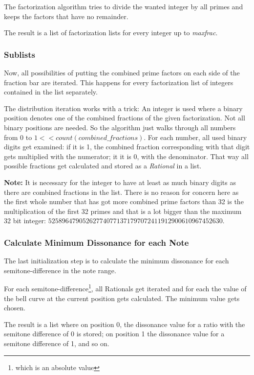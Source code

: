 \documentclass[12pt,a4paper,titlepage,oneside]{report}
\begin{document}
The factorization algorithm tries to divide the wanted integer by all primes and keeps the factors that have no remainder.

The result is a list of factorization lists for every integer up to \textit{maxfrac}.


\subsubsection{Sublists}

Now, all possibilities of putting the combined prime factors on each side of the fraction bar are iterated. This happens for every factorization list of integers contained in the list separately.

The distribution iteration works with a trick: An integer is used where a binary position denotes one of the combined fractions of the given factorization. Not all binary positions are needed. So the algorithm just walks through all numbers from 0 to $1 << count(combined\_fractions)$. For each number, all used binary digits get examined: if it is 1, the combined fraction corresponding with that digit gets multiplied with the numerator; it it is 0, with the denominator. That way all possible fractions get calculated and stored as a \textit{Rational} in a list.

\textbf{Note:} It is necessary for the integer to have at least as much binary digits as there are combined fractions in the list. There is no reason for concern here as the first whole number that has got more combined prime factors than 32 is the multiplication of the first 32 primes and that is a lot bigger than the maximum 32 bit integer: $525896479052627740771371797072411912900610967452630$.


\subsubsection{Calculate Minimum Dissonance for each Note}

The last initialization step is to calculate the minimum dissonance for each semitone-difference in the note range.

For each semitone-difference\footnote{which is an absolute value}, all Rationals get iterated and for each the value of the bell curve at the current position gets calculated. The minimum value gets chosen.

The result is a list where on position 0, the dissonance value for a ratio with the semitone difference of 0 is stored; on position 1 the dissonance value for a semitone difference of 1, and so on.
\end{document}
